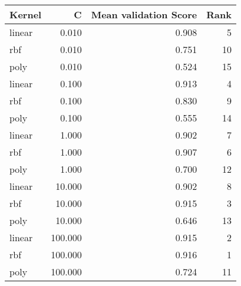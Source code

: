 \begin{tabular}{lrrr}
\toprule
Kernel & C & Mean validation Score & Rank \\
\midrule
linear & 0.010 & 0.908 & 5 \\
rbf & 0.010 & 0.751 & 10 \\
poly & 0.010 & 0.524 & 15 \\
linear & 0.100 & 0.913 & 4 \\
rbf & 0.100 & 0.830 & 9 \\
poly & 0.100 & 0.555 & 14 \\
linear & 1.000 & 0.902 & 7 \\
rbf & 1.000 & 0.907 & 6 \\
poly & 1.000 & 0.700 & 12 \\
linear & 10.000 & 0.902 & 8 \\
rbf & 10.000 & 0.915 & 3 \\
poly & 10.000 & 0.646 & 13 \\
linear & 100.000 & 0.915 & 2 \\
rbf & 100.000 & 0.916 & 1 \\
poly & 100.000 & 0.724 & 11 \\
\bottomrule
\end{tabular}
